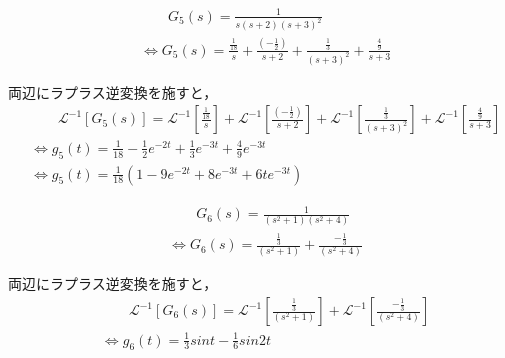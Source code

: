 \documentclass[a4paper,12pt]{article}
\begin{document}
\begin{tcolorbox}[title={1. (5) \( G_5(s)=\frac{ 1 }{ s ( s + 2 ) ( s + 3 )^2 } \) }]
    \vspace{-3mm}
  \begin{align*}
      &\qquad G_5(s) =\frac{ 1 }{ s ( s + 2 ) ( s + 3 )^2 }  \\
      &\Leftrightarrow G_5(s) 
      = \frac{\frac{1}{18}}{s}
      + \frac{(-\frac{1}{2})}{s + 2} 
      + \frac{\frac{1}{3}}{(s + 3)^2} 
      + \frac{\frac{4}{9}}{s + 3} 
  \end{align*}
  
  \quad 両辺にラプラス逆変換を施すと，
  \vspace{-3mm}
  \begin{align*}
      &\qquad \mathcal{L}^{-1} \left[ G_5(s) \right] 
      =\mathcal{L}^{-1} \left[ \frac{\frac{1}{18}}{s} \right]
      + \mathcal{L}^{-1} \left[ \frac{(-\frac{1}{2})}{s + 2} \right]
      + \mathcal{L}^{-1} \left[ \frac{\frac{1}{3}}{(s + 3)^2} \right]
      + \mathcal{L}^{-1} \left[ \frac{\frac{4}{9}}{s + 3} \right] \\
      &\Leftrightarrow g_5(t) = \frac{1}{18} - \frac{1}{2}e^{-2t} + \frac{1}{3}e^{-3t} +\frac{4}{9}e^{-3t}\\
      &\Leftrightarrow g_5(t) =\frac{1}{18} \left(1 - 9e^{-2t} + 8e^{-3t} +6te^{-3t} \right)
  \end{align*}
\end{tcolorbox}

\begin{tcolorbox}[title={1. (6) \( G_6(s)=\frac{ 1 }{ ( s^2 + 1 ) ( s^2 + 4 ) } \) }]
    \vspace{-3mm}
    \begin{align*}
      &\qquad G_6(s) =\frac{ 1 }{ ( s^2 + 1 ) ( s^2 + 4 ) } \\
      &\Leftrightarrow G_6(s) 
      = \frac{ \frac{1}{3} }{ ( s^2 + 1 ) }
      + \frac{ -\frac{1}{3} }{ ( s^2 + 4 ) }
  \end{align*}
  
  \quad 両辺にラプラス逆変換を施すと，
  \vspace{-3mm}
  \begin{align*}
      &\qquad \mathcal{L}^{-1} \left[ G_6(s) \right] 
      =\mathcal{L}^{-1} \left[ \frac{ \frac{1}{3} }{ ( s^2 + 1 ) } \right]
      +\mathcal{L}^{-1} \left[ \frac{- \frac{1}{3} }{ ( s^2 + 4 ) } \right] \\
      &\Leftrightarrow g_6(t) = \frac{1}{3}sin t -\frac{1}{6}sin 2t
  \end{align*}
  
\end{tcolorbox}
\end{document}
